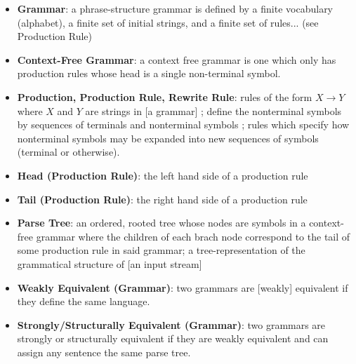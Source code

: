 \documentclass[11pt]{article}
\begin{document}
\begin{itemize}
\item \textbf{Grammar}: a phrase-structure grammar is defined by a finite vocabulary (alphabet), a finite set of
initial strings, and a finite set of rules... \cite{chomsky} (see Production Rule)
\item \textbf{Context-Free Grammar}: a context free grammar is one which only has production rules whose head is a single non-terminal symbol.
\cite{compiler, anatomy, formal_langs}
\item \textbf{Production, Production Rule, Rewrite Rule}: rules of the form $X \rightarrow Y$ where
$X$ and $Y$ are strings in [a grammar]  \cite{chomsky};
define the nonterminal symbols by sequences of terminals and nonterminal symbols \cite{compiler};
rules which specify how nonterminal symbols may be expanded into new sequences of symbols (terminal or otherwise).
\item \textbf{Head (Production Rule)}: the left hand side of a production rule
\item \textbf{Tail (Production Rule)}: the right hand side of a production rule
\item \textbf{Parse Tree}: an ordered, rooted tree whose nodes are symbols in a context-free grammar where the 
children of each brach node correspond to the tail of some production rule in said grammar;
a tree-representation of the grammatical structure of [an input stream] \cite{anatomy}
\item \textbf{Weakly Equivalent (Grammar)}: two grammars are [weakly] equivalent if they define the same language.\cite{reghizzi}
\item \textbf{Strongly/Structurally Equivalent (Grammar)}: two grammars are strongly or structurally equivalent
if they are weakly equivalent and can assign any sentence the same parse tree. \cite{reghizzi}
\end{itemize}


{}

\end{document}
